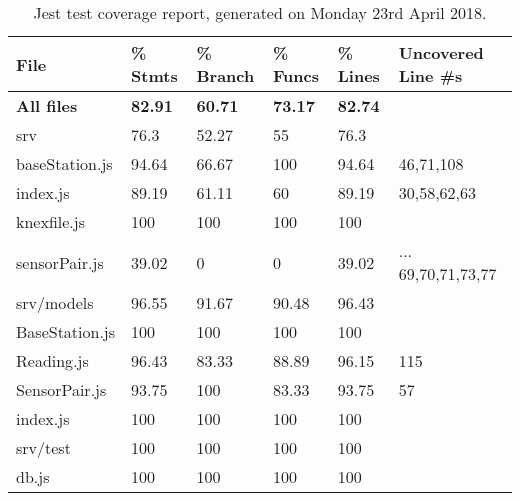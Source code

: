 \begin{table}[]
  \centering
  \label{tab:testcoverage}
  \begin{tabular}{|l|lllll|}
    \hline
  File           & \% Stmts & \% Branch & \% Funcs & \% Lines & Uncovered Line \#s \\ \hline
  \textbf{All files}      & \textbf{82.91}    & \textbf{60.71}     & \textbf{73.17}    & \textbf{82.74}    &                    \\
  srv            & 76.3     & 52.27     & 55       & 76.3     &                    \\
  baseStation.js & 94.64    & 66.67     & 100      & 94.64    & 46,71,108          \\
  index.js       & 89.19    & 61.11     & 60       & 89.19    & 30,58,62,63        \\
  knexfile.js    & 100      & 100       & 100      & 100      &                    \\
  sensorPair.js  & 39.02    & 0         & 0        & 39.02    & ... 69,70,71,73,77 \\
  srv/models     & 96.55    & 91.67     & 90.48    & 96.43    &                    \\
  BaseStation.js & 100      & 100       & 100      & 100      &                    \\
  Reading.js     & 96.43    & 83.33     & 88.89    & 96.15    & 115                \\
  SensorPair.js  & 93.75    & 100       & 83.33    & 93.75    & 57                 \\
  index.js       & 100      & 100       & 100      & 100      &                    \\
  srv/test       & 100      & 100       & 100      & 100      &                    \\
  db.js          & 100      & 100       & 100      & 100      &                   \\ \hline
  \end{tabular}
  \caption{Jest test coverage report, generated on Monday 23rd April 2018.}
\end{table}